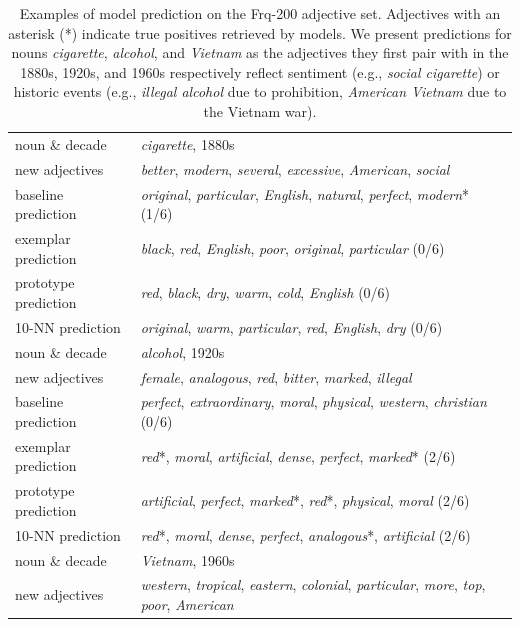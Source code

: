 \documentclass[output=paper]{langsci/langscibook}
\begin{document}
\begin{table}
\small
\caption{Examples of model prediction on the {\sc Frq-200} adjective set.
Adjectives with an asterisk (*) indicate true positives retrieved by models.
We present predictions for nouns {\it cigarette}, {\it alcohol}, and {\it Vietnam} as the adjectives they first pair with in the 1880s, 1920s, and 1960s respectively reflect sentiment (e.g., {\it social cigarette}) or historic events (e.g., {\it illegal alcohol} due to prohibition, {\it American Vietnam} due to the Vietnam war).\label{table:modelpredexamples}}
\begin{tabularx}{\textwidth}{lQ}
\lsptoprule
noun \& decade & {\it cigarette}, 1880s \\
new adjectives & {\it better}, {\it modern}, {\it several}, {\it excessive}, {\it American}, {\it social} \\
baseline prediction & {\it original}, {\it particular}, {\it English}, {\it natural}, {\it perfect}, {\it modern}* (1/6) \\
exemplar prediction & {\it black}, {\it red}, {\it English}, {\it poor}, {\it original}, {\it particular} (0/6) \\
prototype prediction & {\it red}, {\it black}, {\it dry}, {\it warm}, {\it cold}, {\it English} (0/6) \\
10-NN prediction & {\it original}, {\it warm}, {\it particular}, {\it red}, {\it English}, {\it dry} (0/6) \\
\midrule
noun \& decade & {\it alcohol}, 1920s \\
new adjectives & {\it female}, {\it analogous}, {\it red}, {\it bitter}, {\it marked}, {\it illegal} \\
baseline prediction & {\it perfect}, {\it extraordinary}, {\it moral}, {\it physical}, {\it western}, {\it christian} (0/6) \\
exemplar prediction & {\it red}*, {\it moral}, {\it artificial}, {\it dense}, {\it perfect}, {\it marked}* (2/6) \\
prototype prediction & {\it artificial}, {\it perfect}, {\it marked}*, {\it red}*, {\it physical}, {\it moral} (2/6) \\
10-NN prediction & {\it red}*, {\it moral}, {\it dense}, {\it perfect}, {\it analogous}*, {\it artificial} (2/6) \\
\midrule
noun \& decade & {\it Vietnam}, 1960s \\
new adjectives & {\it western}, {\it tropical}, {\it eastern}, {\it colonial}, {\it particular}, {\it more}, {\it top}, {\it poor}, {\it American} \\

\end{tabularx}
\end{table}
\end{document}
